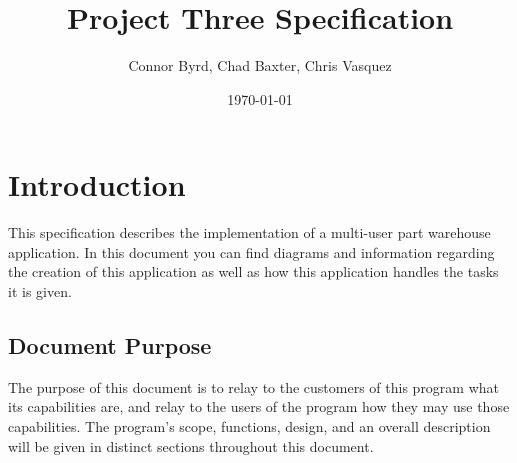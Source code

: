 \documentclass{report}
\begin{document}
\title{Project Three Specification}
\author{Connor Byrd, Chad Baxter, Chris Vasquez}
\date{\today}
\maketitle

\tableofcontents

\renewcommand\thesection{\arabic{section}}
\renewcommand\thesubsection{\thesection.\arabic{subsection}}
\renewcommand\thesubsubsection{\thesubsection.\arabic{subsubsection}}

\clearpage
\section{Introduction}
This specification describes the implementation of a multi-user part warehouse application. In this document you can find diagrams and information regarding the creation of this application as well as how this application handles the tasks it is given. \par
\subsection{Document Purpose}
The purpose of this document is to relay to the customers of this program what its capabilities are, and relay to the users of the program how they may use those capabilities. The program’s scope, functions, design, and an overall description will be given in distinct sections throughout this document.\par
\end{document}
